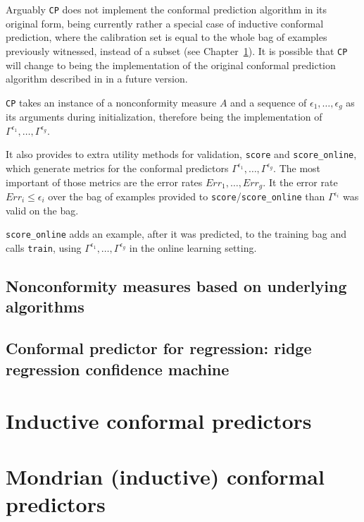 \documentclass[twoside,11pt]{article}
\begin{document}
Arguably \texttt{CP} does not implement the conformal
prediction algorithm in its original form, being currently
rather a special case of inductive conformal prediction,
where the calibration set is equal to the whole bag of
examples previously witnessed, instead of a subset (see
Chapter~\ref{sec:icp}).
It is possible that \texttt{CP} will change to being the
implementation of the original conformal prediction
algorithm described in \citet[][Chapter 2]{alrw} in a
future version.

\texttt{CP} takes an instance of a nonconformity measure
$A$ and a sequence of $\epsilon_1,\dots,\epsilon_{g}$
as its arguments during initialization, therefore being the
implementation of
$\Gamma^{\epsilon_1},\dots,\Gamma^{\epsilon_g}$.

It also provides to extra utility methods for validation,
\texttt{score} and \texttt{score\_online}, which generate
metrics for the conformal predictors
$\Gamma^{\epsilon_1},\dots,\Gamma^{\epsilon_g}$.
The most important of those metrics are the error rates
$Err_1,\dots,Err_{g}$.
It the error rate $Err_i \leq \epsilon_i$ over the bag of
examples provided to \texttt{score}/\texttt{score\_online}
than $\Gamma^{\epsilon_i}$ was valid on the bag.

\texttt{score\_online} adds an example, after it was
predicted, to the training bag and calls \texttt{train},
using $\Gamma^{\epsilon_1},\dots,\Gamma^{\epsilon_g}$ in
the online learning setting.

\subsection{Nonconformity measures based on underlying
            algorithms}
\label{subsec:ncs}



\subsection{Conformal predictor for regression: ridge
            regression confidence machine}
\label{subsec:rrcm}

\section{Inductive conformal predictors}
\label{sec:icp}

\section{Mondrian (inductive) conformal predictors}
\end{document}
